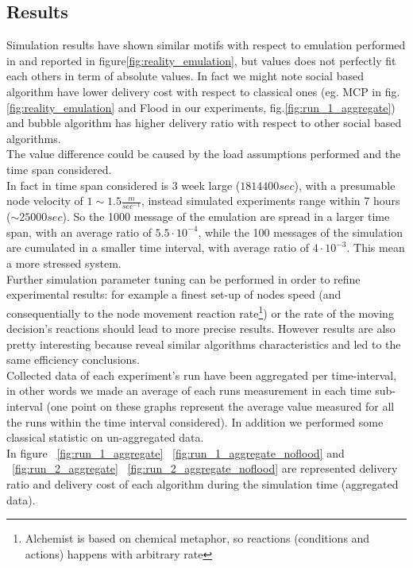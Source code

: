 \newpage
\subsection{Results}
\label{exp_results}

Simulation results have shown similar motifs with respect to emulation performed in\cite{bubble} and reported in figure\ref{fig:reality_emulation}, but values does not perfectly fit each others in term of absolute values. In fact we might note social based algorithm have lower delivery cost with respect to classical ones (eg. MCP in fig.\ref{fig:reality_emulation} and Flood in our experiments, fig.\ref{fig:run_1_aggregate}) and bubble algorithm has higher delivery ratio with respect to other social based algorithms.\\
The value difference could be caused by the load assumptions performed and the time span considered.\\
In fact in\cite[6.2]{bubble} time span considered is 3 week large ($1814400 sec$), with a presumable node velocity of $1\sim1.5 \frac{m}{sec^{-1}}$, instead simulated experiments range within 7 hours ($\sim 25000 sec$). So the 1000 message of the emulation are spread in a larger time span, with an average ratio of $5.5\cdot 10^{-4}$, while the 100 messages of the simulation are cumulated in a smaller time interval, with average ratio of $4\cdot 10^{-3}$. This mean a more stressed system.\\
Further simulation parameter tuning can be performed in order to refine experimental results: for example a finest set-up of nodes speed (and consequentially to the node movement reaction rate\footnote{Alchemist is based on chemical metaphor, so reactions (conditions and actions) happens with arbitrary rate}) or the rate of the moving decision's reactions should lead to more precise results. However results are also pretty interesting because reveal similar algorithms characteristics and led to the same efficiency conclusions.\\
Collected data of each experiment's run have been aggregated per time-interval, in other words we made an average of each runs measurement in each time sub-interval (one point on these graphs represent the average value measured for all the runs within the time interval considered). In addition we performed some classical statistic on un-aggregated data.\\
In figure ~\ref{fig:run_1_aggregate} ~\ref{fig:run_1_aggregate_noflood} and ~\ref{fig:run_2_aggregate} ~\ref{fig:run_2_aggregate_noflood} are represented delivery ratio and delivery cost of each algorithm during the simulation time (aggregated data).\\
